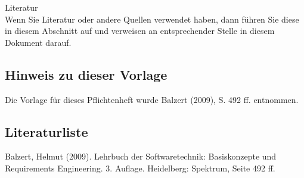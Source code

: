 Literatur\\

Wenn Sie Literatur oder andere Quellen verwendet haben, dann führen Sie diese in diesem Abschnitt auf und verweisen an entsprechender Stelle in diesem Dokument darauf.
\subsection{Hinweis zu dieser Vorlage}
Die Vorlage für dieses Pflichtenheft wurde Balzert (2009), S. 492 ff. entnommen.
\subsection{Literaturliste}
Balzert, Helmut (2009). Lehrbuch der Softwaretechnik: Basiskonzepte und Requirements Engineering. 3. Auflage. Heidelberg: Spektrum, Seite 492 ff.

